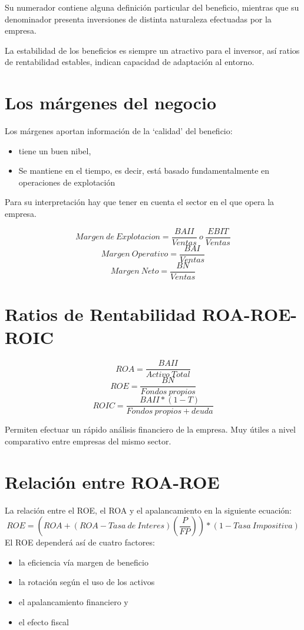 Su numerador contiene alguna definición particular del beneficio, mientras que su denominador presenta inversiones de distinta naturaleza efectuadas por la empresa.

La estabilidad de los beneficios es siempre un atractivo para el inversor, así ratios de rentabilidad estables, indican capacidad de adaptación al entorno.

\section{Los márgenes del negocio}
Los márgenes aportan información de la `calidad' del beneficio:
\begin{itemize}
    \item tiene un buen nibel,
    \item Se mantiene en el tiempo, es decir, está basado fundamentalmente en operaciones de explotación
\end{itemize}

Para su interpretación hay que tener en cuenta el sector en el que opera la empresa.

\[ Margen\ de\ Explotacion = \frac{BAII}{Ventas}\ o\  \frac{EBIT}{Ventas}\]
\[Margen\ Operativo = \frac{BAI}{Ventas}\]
\[Margen\ Neto = \frac{BN}{Ventas}\]

\section{Ratios de Rentabilidad ROA-ROE-ROIC}
\[ROA = \frac{BAII}{Activo\ Total}\]
\[ROE = \frac{BN}{Fondos\ propios}\]
\[ROIC = \frac{BAII*(1-T)}{Fondos\ propios + deuda}\]

Permiten efectuar un rápido análisis financiero de la empresa. Muy útiles a nivel comparativo entre empresas del mismo sector.

\section{Relación entre ROA-ROE}
La relación entre el ROE, el ROA y el apalancamiento en la siguiente ecuación:
\[ROE = ( ROA + (ROA - Tasa\ de\ Interes)(\frac{P}{FP}))*(1 - Tasa\ Impositiva)\]
El ROE dependerá así de cuatro factores:
\begin{itemize}
    \item la eficiencia vía margen de beneficio
    \item la rotación según el uso de los activos
    \item el apalancamiento financiero y 
    \item el efecto fiscal
\end{itemize}

